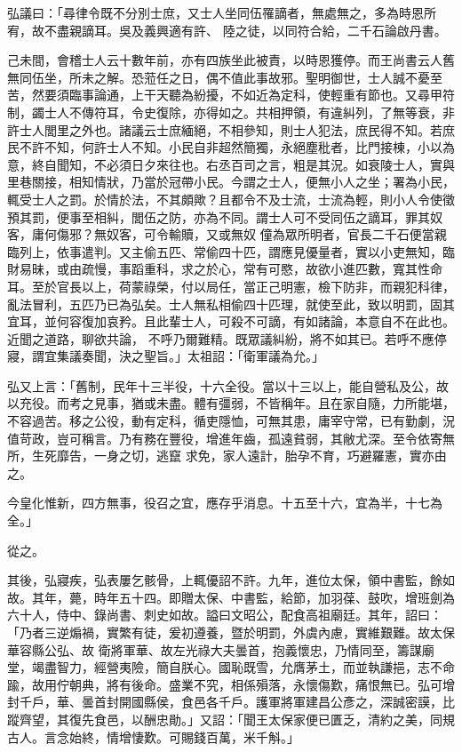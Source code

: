 \begin{pinyinscope}
 弘議曰：「尋律令既不分別士庶，又士人坐同伍罹謫者，無處無之，多為時恩所宥，故不盡親謫耳。吳及義興適有許、
 陸之徒，以同符合給，二千石論啟丹書。



 己未間，會稽士人云十數年前，亦有四族坐此被責，以時恩獲停。而王尚書云人舊無同伍坐，所未之解。恐蒞任之日，偶不值此事故邪。聖明御世，士人誠不憂至苦，然要須臨事論通，上干天聽為紛擾，不如近為定科，使輕重有節也。又尋甲符制，蠲士人不傳符耳，令史復除，亦得如之。共相押領，有違糾列，了無等衰，非許士人閭里之外也。諸議云士庶緬絕，不相參知，則士人犯法，庶民得不知。若庶
 民不許不知，何許士人不知。小民自非超然簡獨，永絕塵秕者，比門接棟，小以為意，終自聞知，不必須日夕來往也。右丞百司之言，粗是其況。如衰陵士人，實與里巷關接，相知情狀，乃當於冠帶小民。今謂之士人，便無小人之坐；署為小民，輒受士人之罰。於情於法，不其頗歟？且都令不及士流，士流為輕，則小人令使徵預其罰，便事至相糾，閭伍之防，亦為不同。謂士人可不受同伍之謫耳，罪其奴客，庸何傷邪？無奴客，可令輸贖，又或無奴
 僮為眾所明者，官長二千石便當親臨列上，依事遣判。又主偷五匹、常偷四十匹，謂應見優量者，實以小吏無知，臨財易昧，或由疏慢，事蹈重科，求之於心，常有可愍，故欲小進匹數，寬其性命耳。至於官長以上，荷蒙祿榮，付以局任，當正己明憲，檢下防非，而親犯科律，亂法冒利，五匹乃已為弘矣。士人無私相偷四十匹理，就使至此，致以明罰，固其宜耳，並何容復加哀矜。且此輩士人，可殺不可謫，有如諸論，本意自不在此也。近聞之道路，聊欲共論，
 不呼乃爾難精。既眾議糾紛，將不如其已。若呼不應停寢，謂宜集議奏聞，決之聖旨。」太祖詔：「衛軍議為允。」



 弘又上言：「舊制，民年十三半役，十六全役。當以十三以上，能自營私及公，故以充役。而考之見事，猶或未盡。體有彊弱，不皆稱年。且在家自隨，力所能堪，不容過苦。移之公役，動有定科，循吏隱恤，可無其患，庸宰守常，已有勤劇，況值苛政，豈可稱言。乃有務在豐役，增進年齒，孤遠貧弱，其敝尤深。至令依寄無所，生死靡告，一身之切，逃竄
 求免，家人遠計，胎孕不育，巧避羅憲，實亦由之。



 今皇化惟新，四方無事，役召之宜，應存乎消息。十五至十六，宜為半，十七為全。」



 從之。



 其後，弘寢疾，弘表屢乞骸骨，上輒優詔不許。九年，進位太保，領中書監，餘如故。其年，薨，時年五十四。即贈太保、中書監，給節，加羽葆、鼓吹，增班劍為六十人，侍中、錄尚書、刺史如故。謚曰文昭公，配食高祖廟廷。其年，詔曰：「乃者三逆煽禍，實繁有徒，爰初遵養，暨於明罰，外虞內慮，實維艱難。故太保華容縣公弘、故
 衛將軍華、故左光祿大夫曇首，抱義懷忠，乃情同至，籌謀廟堂，竭盡智力，經營夷險，簡自朕心。國恥既雪，允膺茅土，而並執謙挹，志不命踰，故用佇朝典，將有後命。盛業不究，相係殞落，永懷傷歎，痛恨無已。弘可增封千戶，華、曇首封開國縣侯，食邑各千戶。護軍將軍建昌公彥之，深誠密謨，比蹤齊望，其復先食邑，以酬忠勛。」又詔：「聞王太保家便已匱乏，清約之美，同規古人。言念始終，情增悽歎。可賜錢百萬，米千斛。」




\end{pinyinscope}
